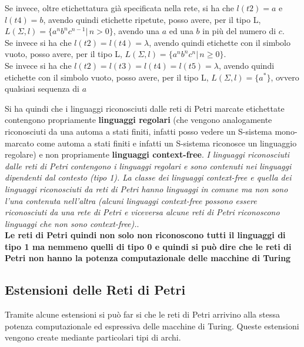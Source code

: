 \documentclass[a4paper,12pt, oneside]{book}
\begin{document}
\begin{esempio}
\begin{itemize}
  \end{itemize}
  Se invece, oltre etichettatura già specificata nella rete, si ha che
  $l(t2)=a$ e $l(t4)=b$, avendo quindi etichette ripetute, posso avere, per il
  tipo L, $L(\Sigma,l)=\{a^nb^nc^{n-1}|\,n> 0\}$, avendo una $a$ ed una $b$ in
  più del numero di $c$.\\
  Se invece si ha che $l(t2)=l(t4)=\lambda$, avendo quindi etichette con il
  simbolo vuoto, posso avere, per il tipo L, $L(\Sigma,l)=\{a^nb^nc^n|\,n\geq
  0\}$.\\
  Se invece si ha che $l(t2)=l(t3)=l(t4)=l(t5)=\lambda$, avendo quindi
  etichette con il simbolo vuoto, posso avere, per il tipo L,
  $L(\Sigma,l)=\{a^*\}$, ovvero qualsiasi sequenza di $a$
\end{esempio}
Si ha quindi che i linguaggi riconosciuti dalle reti di Petri marcate
etichettate contengono propriamente \textbf{linguaggi regolari} (che vengono
analogamente riconosciuti da una automa a stati finiti, infatti posso vedere un
S-sistema mono-marcato come automa a stati finiti e infatti un S-sistema
riconosce un linguaggio regolare) e non propriamente \textbf{linguaggi
  context-free}. \textit{I linguaggi riconosciuti dalle reti di Petri contengono
  i linguaggi regolari e sono contenuti nei linguaggi dipendenti dal contesto
  (tipo 1). La classe dei linguaggi context-free e quella dei linguaggi
  riconosciuti da reti di Petri hanno linguaggi in comune ma non sono l’una
  contenuta nell’altra (alcuni linguaggi context-free possono essere
  riconosciuti da una rete di Petri e viceversa alcune reti di Petri riconoscono
  linguaggi che non sono context-free).}.\\
\textbf{Le reti di Petri quindi non solo non riconoscono tutti il linguaggi di
  tipo 1 ma nemmeno quelli di tipo 0 e quindi si può dire che le reti di Petri
  non hanno la potenza computazionale delle macchine di Turing}
\subsection{Estensioni delle Reti di Petri}
Tramite alcune estensioni si può far si che le reti di Petri arrivino alla
stessa potenza computazionale ed espressiva delle macchine di Turing. Queste
estensioni vengono create mediante particolari tipi di archi.\\
\end{document}
